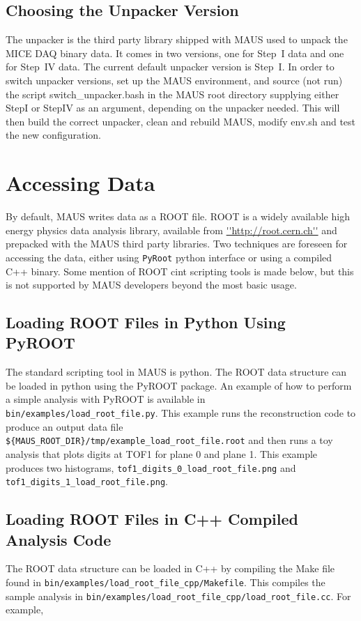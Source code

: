 \subsection{Choosing the Unpacker Version}
The unpacker is the third party library shipped with MAUS used to unpack the MICE DAQ binary data.  It comes in two versions, one for Step~I data and one for Step~IV data.  The current default unpacker version is Step~I.  In order to switch unpacker versions, set up the MAUS environment, and source (not run) the script switch\_unpacker.bash in the MAUS root directory supplying either StepI or StepIV as an argument, depending on the unpacker needed. This will then build the correct unpacker, clean and rebuild MAUS, modify env.sh and test the new configuration.

\section{Accessing Data}
By default, MAUS writes data as a ROOT file. ROOT is a widely available high energy physics data analysis library, available from \url{''http://root.cern.ch''} and prepacked with the MAUS third party libraries. Two techniques are foreseen for accessing the data, either using \verb|PyRoot| python interface or using a compiled C++ binary. Some mention of ROOT cint scripting tools is made below, but this is not supported by MAUS developers beyond the most basic usage.

\subsection{Loading ROOT Files in Python Using PyROOT}
The standard scripting tool in MAUS is python. The ROOT data structure can be loaded in python using the PyROOT package. An example of how to perform a simple analysis with PyROOT is available in \verb|bin/examples/load_root_file.py|. This example runs the reconstruction code to produce an output data file \verb|${MAUS_ROOT_DIR}/tmp/example_load_root_file.root| and then runs a toy analysis that plots digits at TOF1 for plane 0 and plane 1. This example produces two histograms, \verb|tof1_digits_0_load_root_file.png| and \verb|tof1_digits_1_load_root_file.png|.

\subsection{Loading ROOT Files in C++ Compiled Analysis Code}
The ROOT data structure can be loaded in C++ by compiling the Make file found in \verb|bin/examples/load_root_file_cpp/Makefile|. This compiles the sample analysis in \verb|bin/examples/load_root_file_cpp/load_root_file.cc|. For example,

